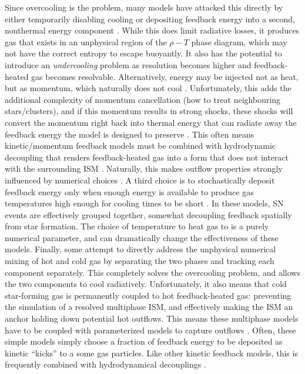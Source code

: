 Since overcooling is the problem, many models have attacked this directly by
either temporarily disabling cooling \citep{Thacker2000,Stinson2006} or
depositing feedback energy into a second, nonthermal energy component
\citep{Agertz2013}.  While this does limit radiative losses, it produces gas
that exists in an unphysical region of the $\rho-T$ phase diagram, which may not
have the correct entropy to escape buoyantly.  It also has the potential to
introduce an \textit{undercooling} problem as resolution becomes higher and
feedback-heated gas becomes resolvable.  Alternatively, energy may be injected
not as heat, but as momentum, which naturally does not cool
\citep{Scannapieco2006,DallaVecchia2008,Dubois2008}.  Unfortunately, this adds
the additional complexity of momentum cancellation (how to treat neighbouring
stars/clusters), and if this momentum results in strong shocks, these shocks
will convert the momentum right back into thermal energy that can radiate away
the feedback energy the model is designed to preserve \citep{Durier2012}.  This
often means kinetic/momentum feedback models must be combined with hydrodynamic
decoupling that renders feedback-heated gas into a form that does not interact
with the surrounding ISM \citep{Springel2003,Vogelsberger2013}.  Naturally, this
makes outflow properties strongly influenced by numerical choices
\citep{DallaVecchia2008}.  A third choice is to stochastically deposit feedback
energy only when enough energy is available to produce gas temperatures high
enough for cooling times to be short \citep{DallaVecchia2012,Crain2015}.  In
these models, SN events are effectively grouped together, somewhat
decoupling feedback spatially from star formation.  The choice of temperature to heat gas
to is a purely numerical parameter, and can dramatically change the
effectiveness of these models.  Finally, some \citep{Springel2003,Murante2015}
attempt to directly address the unphysical numerical mixing of hot and cold gas
by separating the two phases and tracking each component separately.  This
completely solves the overcooling problem, and allows the two components to cool
radiatively.   Unfortunately, it also means that cold star-forming gas is
permanently coupled to hot feedback-heated gas: preventing the simulation of  a
resolved multiphase ISM, and effectively making the ISM an
anchor holding down potential hot outflows.  This means these multiphase models
have to be coupled with parameterized models to capture outflows
\citep{Springel2003}.  Often, these
simple models simply choose a fraction of feedback energy to be deposited as
kinetic ``kicks'' to a some gas particles.  Like other kinetic feedback models,
this is frequently combined with hydrodynamical decouplings
\citep{Vogelsberger2013}.

